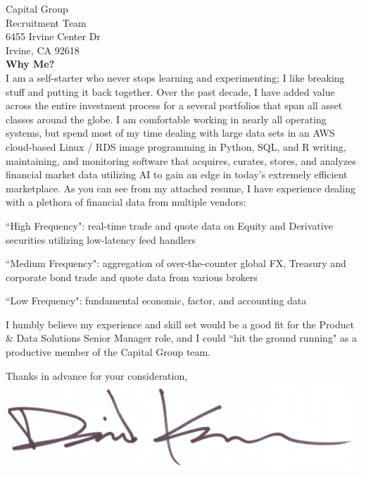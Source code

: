 \documentclass{letter}
\begin{document}
\begin{letter}{
  Capital Group \\
  Recruitment Team \\ 
  6455 Irvine Center Dr \\
  Irvine, CA 92618 \\
}
\textbf{Why Me?} \\
I am a self-starter who never stops learning and experimenting;
I like breaking stuff and putting it back together. Over the past
decade, I have added value across the entire investment process for a several
portfolios that span all asset classes around the globe. I am comfortable working
in nearly all operating systems, but spend most of my time dealing with large data
sets in an AWS cloud-based Linux / RDS image programming in Python, SQL, and R
writing, maintaining, and monitoring software that acquires, curates, stores, and
analyzes financial market data utilizing AI to gain an edge
in today's extremely efficient marketplace. As you can see from my attached resume,
I have experience dealing with a plethora of financial data from multiple vendors:
\begin{list}{}{\leftmargin=1em}
  \item ``High Frequency": real-time trade and quote data on Equity and Derivative
  securities utilizing low-latency feed handlers
  \item ``Medium Frequency": aggregation of over-the-counter global FX, Treasury and
  corporate bond trade and quote data from various brokers
  \item ``Low Frequency": fundamental economic, factor, and accounting data
\end{list}

\newpage

I humbly believe my experience and skill set would be a good fit for the Product \& Data
Solutions Senior Manager role, and I could ``hit the ground running"
as a productive member of the Capital Group team.


\closing{
  Thanks in advance for your consideration, \\
  \vspace{.33in}
  \includegraphics[scale=0.33]{signature.png}
}

\end{letter}
\end{document}
